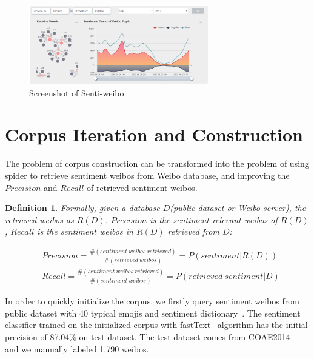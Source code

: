 \documentclass[runningheads]{llncs}
\begin{document}
\begin{figure}[htp]
\begin{center}
\includegraphics[width=0.7\textwidth]{images/system-screenshot.png}
\caption{Screenshot of Senti-weibo}
\label{fig:system-screenshot}
\end{center}
\end{figure}

\section{Corpus Iteration and Construction}
The problem of corpus construction can be transformed into the problem of using spider to retrieve sentiment weibos from Weibo database, and improving the $Precision$ and $Recall$ of retrieved sentiment weibos. 

\newtheorem{myDef}{Definition}

\begin{myDef}
Formally, given a database $D$(public dataset or Weibo server), the retrieved weibos as $R(D)$.  $Precision$ is the sentiment relevant weibos of $R(D)$, $Recall$ is the sentiment weibos in $R(D)$ retrieved from $D$:

\scriptsize{ %
\begin{align}
&Precision = \frac{\#\left ( sentiment\ weibos\ retrieved \right )}{\#\left ( retrieved\ weibos \right )} = P\left ( sentiment | R(D) \right ) \\
&Recall = \frac{\#\left ( sentiment\ weibos\ retrieved \right )}{\#\left ( sentiment\ weibos \right )} = P\left (retrieved\ sentiment | D\right )
\end{align}
} %
\end{myDef}



In order to quickly initialize the corpus, we firstly query sentiment weibos from public dataset with 40 typical emojis and sentiment dictionary~\cite{ku2006opinion}. The sentiment classifier trained on the initialized corpus with fastText~\cite{joulin2016bag} algorithm has the initial precision of 87.04\% on test dataset. The test dataset comes from COAE2014~\cite{Yang2015Task} and we manually labeled 1,790 weibos.
\end{document}
